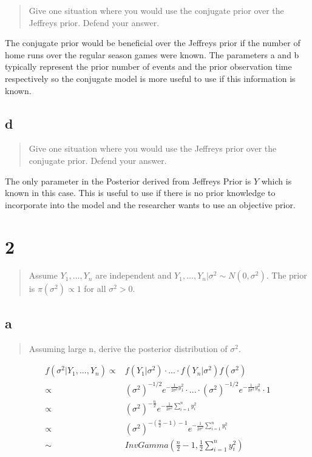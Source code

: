 \documentclass[11pt]{article}
\begin{document}
\begin{quote}
Give one situation where you would use the conjugate prior over the Jeffreys
prior. Defend your answer.
\end{quote}

The conjugate prior would be beneficial over the Jeffreys prior if the
number of home runs over the regular season games were known. The parameters a
and b typically represent the prior number of events and the prior observation
time respectively so the conjugate model is more useful to use if this
information is known.

\subsection{d}
\label{sec:orgf6c9da3}

\begin{quote}
Give one situation where you would use the Jeffreys prior over the conjugate
prior. Defend your answer.
\end{quote}

The only parameter in the Posterior derived from Jeffreys Prior is \(Y\) which is
known in this case. This is useful to use if there is no prior knowledge to
incorporate into the model and the researcher wants to use an objective prior.

\section{2}
\label{sec:orge1fb287}

\begin{quote}
Assume \(Y_1, ..., Y_n\) are independent and \(Y_1, ..., Y_n | \sigma^2 \sim N(0,
\sigma^2)\). The prior is \(\pi (\sigma^2) \propto 1\) for all \(\sigma^2 > 0\).
\end{quote}


\subsection{a}
\label{sec:orge25b47a}

\begin{quote}
Assuming large n, derive the posterior distribution of \(\sigma^2\).
\end{quote}

\begin{equation}
\begin{split}
f(\sigma^2 | Y_1, ..., Y_n) \propto & f(Y_1| \sigma^2) \cdot ... \cdot f(Y_n | \sigma^2) f( \sigma^2)\\
\propto & (\sigma^2)^{- 1/2} e^{- \frac{1}{2 \sigma^2} y_1^2} \cdot ... \cdot  (\sigma^2)^{- 1/2} e^{- \frac{1}{2 \sigma^2} y_n^2} \cdot 1\\
\propto & (\sigma^2)^{-\frac{n}{2}} e^{- \frac{1}{2 \sigma^2} \sum_{i = 1}^{n} y_i^2}\\
\propto & (\sigma^2)^{-(\frac{n}{2} - 1) - 1} e^{- \frac{1}{2 \sigma^2} \sum_{i = 1}^{n} y_i^2}\\
\sim & InvGamma(\frac{n}{2} - 1, \frac{1}{2} \sum_{i = 1}^{n} y_i^2)
\end{split}
\end{equation}
\end{document}

